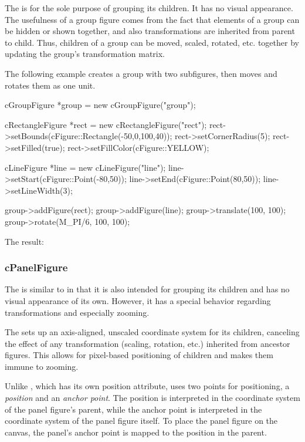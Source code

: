 The  is for the sole purpose of grouping its children. It
has no visual appearance. The usefulness of a group figure comes from the
fact that elements of a group can be hidden or shown together, and also
transformations are inherited from parent to child. Thus, children of a
group can be moved, scaled, rotated, etc. together by updating the group's
transformation matrix.

The following example creates a group with two subfigures, then moves and
rotates them as one unit.

\begin{cpp}
cGroupFigure *group = new cGroupFigure("group");

cRectangleFigure *rect = new cRectangleFigure("rect");
rect->setBounds(cFigure::Rectangle(-50,0,100,40));
rect->setCornerRadius(5);
rect->setFilled(true);
rect->setFillColor(cFigure::YELLOW);

cLineFigure *line = new cLineFigure("line");
line->setStart(cFigure::Point(-80,50));
line->setEnd(cFigure::Point(80,50));
line->setLineWidth(3);

group->addFigure(rect);
group->addFigure(line);
group->translate(100, 100);
group->rotate(M_PI/6, 100, 100);
\end{cpp}


The result:

\begin{center}

\end{center}


\subsubsection{cPanelFigure}
\label{sec:graphics:panelfigure}

The  is similar to  in that it is also
intended for grouping its children and has no visual appearance of its own.
However, it has a special behavior regarding transformations and especially zooming.

The  sets up an axis-aligned, unscaled coordinate system for
its children, canceling the effect of any transformation (scaling, rotation,
etc.) inherited from ancestor figures. This allows for pixel-based positioning
of children and makes them immune to zooming.

Unlike , which has its own position attribute,
 uses two points for positioning, a \textit{position} and
an \textit{anchor point}. The position is interpreted in the coordinate system of
the panel figure's parent, while the anchor point is interpreted in the
coordinate system of the panel figure itself. To place the panel figure on the
canvas, the panel's anchor point is mapped to the position in the parent.

